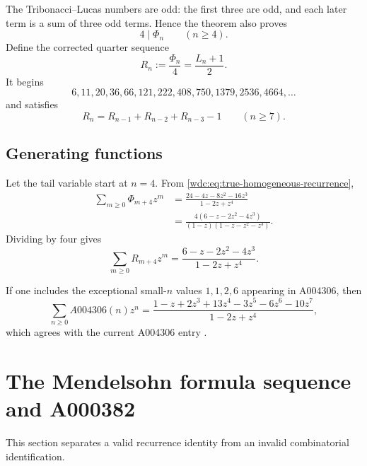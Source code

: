 \documentclass[11pt,letterpaper]{article}
\numberwithin{equation}{section}
\theoremstyle{definition}
\begin{document}
The Tribonacci--Lucas numbers are odd: the first three are odd, and each later
term is a sum of three odd terms.  Hence the theorem also proves
\begin{equation}\label{wdc:eq:divisibility4}
  4\mid\Phi_n\qquad(n\ge4).
\end{equation}
Define the corrected quarter sequence
\begin{equation}\label{wdc:eq:R-def}
  R_n:=\frac{\Phi_n}{4}=\frac{L_n+1}{2}.
\end{equation}
It begins
\begin{equation}\label{wdc:eq:R-values}
  6,11,20,36,66,121,222,408,750,1379,2536,4664,\dots
\end{equation}
and satisfies
\begin{equation}\label{wdc:eq:R-affine}
  R_n=R_{n-1}+R_{n-2}+R_{n-3}-1
  \qquad(n\ge7).
\end{equation}

\subsection{Generating functions}

Let the tail variable start at $n=4$.  From
\eqref{wdc:eq:true-homogeneous-recurrence},
\begin{align}
  \sum_{m\ge0}\Phi_{m+4}z^m
  &=\frac{24-4z-8z^2-16z^3}{1-2z+z^4} \label{wdc:eq:Phi-tail-gf}\\
  &=\frac{4(6-z-2z^2-4z^3)}{(1-z)(1-z-z^2-z^3)}.\nonumber
\end{align}
Dividing by four gives
\begin{equation}\label{wdc:eq:R-tail-gf}
  \boxed{
  \sum_{m\ge0}R_{m+4}z^m
  =\frac{6-z-2z^2-4z^3}{1-2z+z^4}.}
\end{equation}

If one includes the exceptional small-$n$ values
$1,1,2,6$ appearing in A004306, then
\begin{equation}\label{wdc:eq:A004306-full-gf}
 \sum_{n\ge0}A004306(n)z^n
 =\frac{1-z+2z^3+13z^4-3z^5-6z^6-10z^7}{1-2z+z^4},
\end{equation}
which agrees with the current A004306 entry \cite{oeisA004306}.

\section{The Mendelsohn formula sequence and A000382}\label{wdc:sec:ghost}

This section separates a valid recurrence identity from an invalid
combinatorial identification.
\end{document}
